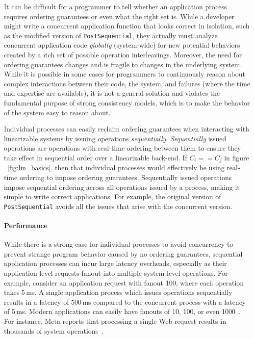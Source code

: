 It can be difficult for a programmer to tell whether an application process requires ordering guarantees or even what the right set is.
While a developer might write a concurrent application function that looks correct in isolation, such as the modified version of \texttt{PostSequential}, they actually must analyze concurrent application code \textit{globally} (system-wide) for new potential behaviors created by a rich set of possible operation interleavings.
Moreover, the need for ordering guarantees changes and is fragile to changes in the underlying system. While it is possible in some cases for programmers to continuously reason about complex interactions between their code, the system, and failures (where the time and expertise are available), it is not a general solution and violates the fundamental purpose of strong consistency models, which is to make the behavior of the system easy to reason about. 

Individual processes can easily reclaim ordering guarantees when interacting with linearizable systems by issuing operations \textit{sequentially}. \textit{Sequentially} issued operations are operations with real-time ordering between them to ensure they take effect in sequential order over a linearizable back-end. If $C_i == C_j$ in figure ~\ref{fig:lin_basics}, then that individual processes would effectively be using real-time ordering to impose ordering guarantees. Sequentially issued operations impose sequential ordering across all operations issued by a process, making it simple to write correct applications. For example, the original version of \texttt{PostSequential} avoids all the issues that arise with the concurrent version.

\paragraph{Performance}
While there is a strong case for individual processes to avoid concurrency to prevent strange program behavior caused by no ordering guarantees, sequential application processes can incur large latency overheads, especially as their application-level requests fanout into multiple system-level operations. For example, consider an application request with fanout 100, where each operation takes 5\,ms. A single application process which issues operations sequentially results in a latency of 500\,ms compared to the concurrent process with a latency of 5\,ms.
Modern applications can easily have fanouts of 10, 100, or even 1000~\cite{dean2013tail}. For instance, Meta reports that processing a single Web request results in thousands of system operations~\cite{ajoux2015challenges}. 

